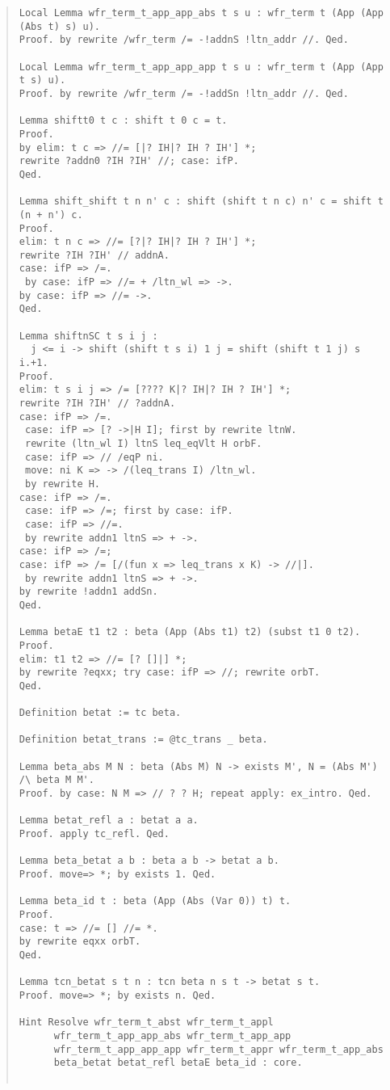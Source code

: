 \documentclass[12pt, titlepage]{ltjsarticle}
\begin{document}
\begin{quote}
\begin{verbatim}
Local Lemma wfr_term_t_app_app_abs t s u : wfr_term t (App (App (Abs t) s) u).
Proof. by rewrite /wfr_term /= -!addnS !ltn_addr //. Qed.

Local Lemma wfr_term_t_app_app_app t s u : wfr_term t (App (App t s) u).
Proof. by rewrite /wfr_term /= -!addSn !ltn_addr //. Qed.

Lemma shiftt0 t c : shift t 0 c = t.
Proof.
by elim: t c => //= [|? IH|? IH ? IH'] *;
rewrite ?addn0 ?IH ?IH' //; case: ifP.
Qed.

Lemma shift_shift t n n' c : shift (shift t n c) n' c = shift t (n + n') c.
Proof.
elim: t n c => //= [?|? IH|? IH ? IH'] *;
rewrite ?IH ?IH' // addnA.
case: ifP => /=.
 by case: ifP => //= + /ltn_wl => ->.
by case: ifP => //= ->.
Qed.

Lemma shiftnSC t s i j :
  j <= i -> shift (shift t s i) 1 j = shift (shift t 1 j) s i.+1.
Proof.
elim: t s i j => /= [???? K|? IH|? IH ? IH'] *;
rewrite ?IH ?IH' // ?addnA.
case: ifP => /=.
 case: ifP => [? ->|H I]; first by rewrite ltnW.
 rewrite (ltn_wl I) ltnS leq_eqVlt H orbF.
 case: ifP => // /eqP ni.
 move: ni K => -> /(leq_trans I) /ltn_wl.
 by rewrite H.
case: ifP => /=.
 case: ifP => /=; first by case: ifP.
 case: ifP => //=.
 by rewrite addn1 ltnS => + ->.
case: ifP => /=;
case: ifP => /= [/(fun x => leq_trans x K) -> //|].
 by rewrite addn1 ltnS => + ->.
by rewrite !addn1 addSn.
Qed.

Lemma betaE t1 t2 : beta (App (Abs t1) t2) (subst t1 0 t2).
Proof.
elim: t1 t2 => //= [? []|] *;
by rewrite ?eqxx; try case: ifP => //; rewrite orbT.
Qed.

Definition betat := tc beta.

Definition betat_trans := @tc_trans _ beta.

Lemma beta_abs M N : beta (Abs M) N -> exists M', N = (Abs M') /\ beta M M'.
Proof. by case: N M => // ? ? H; repeat apply: ex_intro. Qed.

Lemma betat_refl a : betat a a.
Proof. apply tc_refl. Qed.

Lemma beta_betat a b : beta a b -> betat a b.
Proof. move=> *; by exists 1. Qed.

Lemma beta_id t : beta (App (Abs (Var 0)) t) t.
Proof.
case: t => //= [] //= *.
by rewrite eqxx orbT.
Qed.

Lemma tcn_betat s t n : tcn beta n s t -> betat s t.
Proof. move=> *; by exists n. Qed.

Hint Resolve wfr_term_t_abst wfr_term_t_appl
      wfr_term_t_app_app_abs wfr_term_t_app_app
      wfr_term_t_app_app_app wfr_term_t_appr wfr_term_t_app_abs
      beta_betat betat_refl betaE beta_id : core.


\end{verbatim}
\end{quote}
\end{document}
